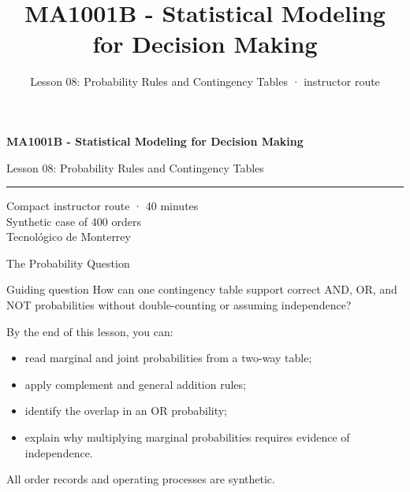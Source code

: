 \documentclass[aspectratio=169,10pt,english]{beamer}
\title{MA1001B - Statistical Modeling for Decision Making}
\subtitle{Lesson 08: Probability Rules and Contingency Tables · instructor route}
\author{}
\institute{Tecnol\'ogico de Monterrey}
\date{}
\begin{document}
\begin{frame}[plain]
  \vspace{1.2cm}
  {\Large\bfseries MA1001B - Statistical Modeling for Decision Making\par}
  \vspace{0.7cm}
  {\large Lesson 08: Probability Rules and Contingency Tables\par}
  \vspace{0.7cm}
  {\color{TecRojo}\rule{\textwidth}{1.2pt}}
  \vspace{0.8cm}

  Compact instructor route · 40 minutes\\[0.3cm]
  Synthetic case of 400 orders\\[0.3cm]
  Tecnol\'ogico de Monterrey
\end{frame}

\begin{frame}{The Probability Question}
  \begin{alertblock}{Guiding question}
    How can one contingency table support correct AND, OR, and NOT
    probabilities without double-counting or assuming independence?
  \end{alertblock}

  \vspace{0.4em}
  By the end of this lesson, you can:
  \begin{itemize}
    \item read marginal and joint probabilities from a two-way table;
    \item apply complement and general addition rules;
    \item identify the overlap in an OR probability;
    \item explain why multiplying marginal probabilities requires evidence of
      independence.
  \end{itemize}

  \vfill
  \scriptsize All order records and operating processes are synthetic.
\end{frame}
\end{document}
